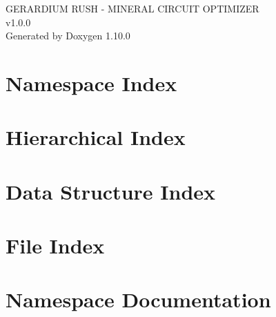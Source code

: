 \documentclass[twoside]{book}
\newcommand{\+}{\discretionary{\mbox{\scriptsize$\hookleftarrow$}}{}{}}
\newcommand{\clearemptydoublepage}{%
    \newpage{\pagestyle{empty}\cleardoublepage}%
  }
\begin{document}
  \raggedbottom
    \hypersetup{pageanchor=false,
                bookmarksnumbered=true,
                pdfencoding=unicode
               }
  \begin{titlepage}
  \vspace*{7cm}
  \begin{center}%
  {\Large GERARDIUM RUSH -\/ MINERAL CIRCUIT OPTIMIZER}\\
  [1ex]\large v1.\+0.\+0 \\
  \vspace*{1cm}
  {\large Generated by Doxygen 1.10.0}\\
  \end{center}
  \end{titlepage}
  \clearemptydoublepage
  \tableofcontents
  \clearemptydoublepage
  \hypersetup{pageanchor=true}






\chapter{Namespace Index}

\chapter{Hierarchical Index}

\chapter{Data Structure Index}

\chapter{File Index}

\chapter{Namespace Documentation}


\end{document}
